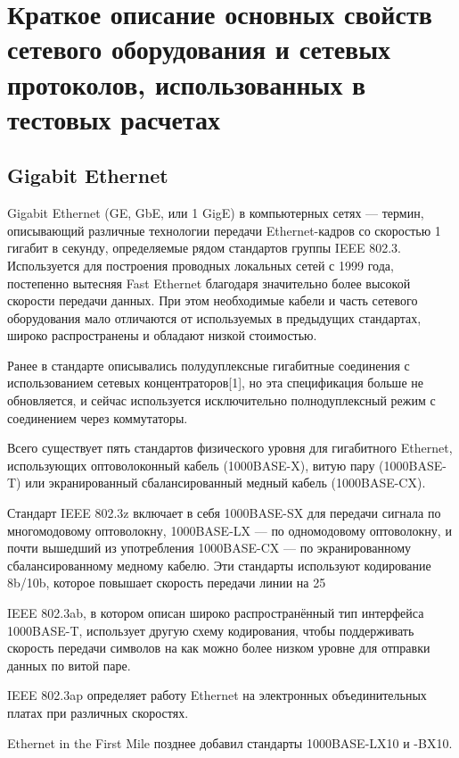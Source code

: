 \chapter{Краткое описание основных свойств сетевого оборудования и сетевых протоколов, использованных в тестовых расчетах} \label{AppendixB}

\section{Gigabit Ethernet}

Gigabit Ethernet (GE, GbE, или 1 GigE) в компьютерных сетях — термин, описывающий различные технологии передачи Ethernet-кадров со скоростью 1 гигабит в секунду, определяемые рядом стандартов группы IEEE 802.3. Используется для построения проводных локальных сетей с 1999 года, постепенно вытесняя Fast Ethernet благодаря значительно более высокой скорости передачи данных. При этом необходимые кабели и часть сетевого оборудования мало отличаются от используемых в предыдущих стандартах, широко распространены и обладают низкой стоимостью.

Ранее в стандарте описывались полудуплексные гигабитные соединения с использованием сетевых концентраторов[1], но эта спецификация больше не обновляется, и сейчас используется исключительно полнодуплексный режим с соединением через коммутаторы. 


Всего существует пять стандартов физического уровня для гигабитного Ethernet, использующих оптоволоконный кабель (1000BASE-X), витую пару (1000BASE-T) или экранированный сбалансированный медный кабель (1000BASE-CX).

Стандарт IEEE 802.3z включает в себя 1000BASE-SX для передачи сигнала по многомодовому оптоволокну, 1000BASE-LX — по одномодовому оптоволокну, и почти вышедший из употребления 1000BASE-CX — по экранированному сбалансированному медному кабелю. Эти стандарты используют кодирование 8b/10b, которое повышает скорость передачи линии на 25 %

IEEE 802.3ab, в котором описан широко распространённый тип интерфейса 1000BASE-T, использует другую схему кодирования, чтобы поддерживать скорость передачи символов на как можно более низком уровне для отправки данных по витой паре.

IEEE 802.3ap определяет работу Ethernet на электронных объединительных платах при различных скоростях.

Ethernet in the First Mile позднее добавил стандарты 1000BASE-LX10 и -BX10. 

